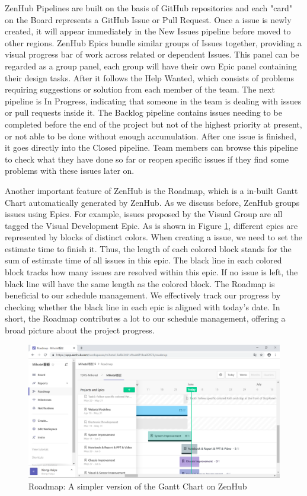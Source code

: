 ZenHub Pipelines are built on the basis of GitHub repositories and each "card" on the Board represents a GitHub Issue or Pull Request. Once a issue is newly created, it will appear immediately in the New Issues pipeline before moved to other regions. ZenHub Epics bundle similar groups of Issues together, providing a visual progress bar of work across related or dependent Issues. This panel can be regarded as a group panel, each group will have their own Epic panel containing their design tasks. After it follows the Help Wanted, which consists of  problems requiring suggestions or solution from each member of the team. The next pipeline is In Progress, indicating that someone in the team is dealing with issues or pull requests inside it. The Backlog pipeline contains issues needing to be completed before the end of the project but not of the highest priority at present, or not able to be done without enough accumulation. After one issue is finished, it goes directly into the Closed pipeline. Team members can browse this pipeline to check what they have done so far or reopen specific issues if they find some problems with these issues later on.

Another important feature of ZenHub is the Roadmap, which is a in-built Gantt Chart automatically generated by ZenHub. As we discuss before, ZenHub groups issues using Epics. For example, issues proposed by the Visual Group are all tagged the Visual Development Epic. As is shown in Figure \ref{fig:roadmap}, different epics are represented by blocks of distinct colors. When creating a issue, we need to set the estimate time to finish it. Thus, the length of each colored block stands for the sum of estimate time of all issues in this epic. The black line in each colored block tracks how many issues are resolved within this epic. If no issue is left, the black line will have the same length as the colored block. The Roadmap is beneficial to our schedule management. We effectively track our progress by checking whether the black line in each epic is aligned with today's date. In short, the Roadmap contributes a lot to our schedule management, offering a broad picture about the project progress.

\begin{figure}[htbp]
    \centering
    \includegraphics[width=14cm]{management/img_management/Roadmap.png}
    \caption{Roadmap: A simpler version of the Gantt Chart on ZenHub}
    \label{fig:roadmap}
\end{figure}

